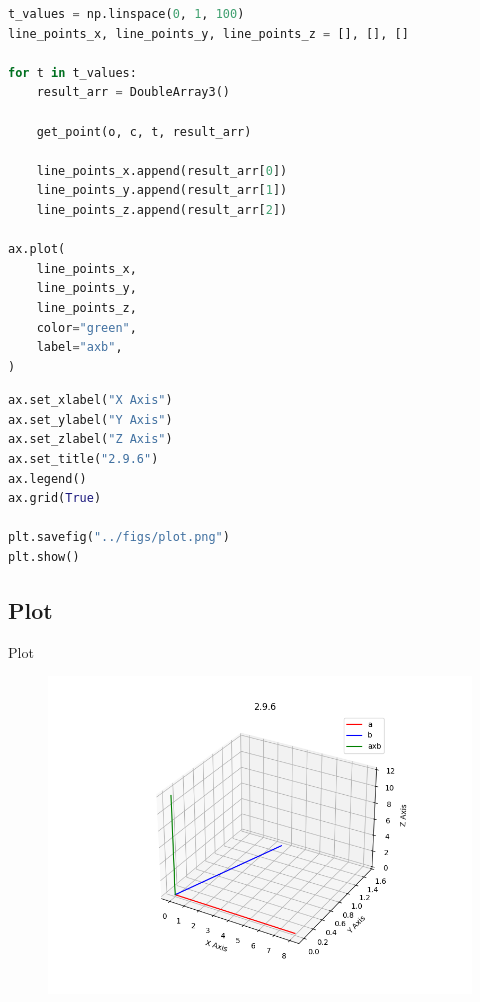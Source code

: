 \documentclass{beamer}
\theoremstyle{remark}
\numberwithin{equation}{section}
\begin{document}
\begin{frame}[fragile]
 \begin{lstlisting}[language=Python]
  t_values = np.linspace(0, 1, 100)
line_points_x, line_points_y, line_points_z = [], [], []

for t in t_values:
    result_arr = DoubleArray3()

    get_point(o, c, t, result_arr)

    line_points_x.append(result_arr[0])
    line_points_y.append(result_arr[1])
    line_points_z.append(result_arr[2])

ax.plot(
    line_points_x,
    line_points_y,
    line_points_z,
    color="green",
    label="axb",
)
 \end{lstlisting}
\end{frame}
\begin{frame}[fragile]
 \begin{lstlisting}[language=Python]
ax.set_xlabel("X Axis")
ax.set_ylabel("Y Axis")
ax.set_zlabel("Z Axis")
ax.set_title("2.9.6")
ax.legend()
ax.grid(True)

plt.savefig("../figs/plot.png")
plt.show()
 \end{lstlisting}
\end{frame}
\subsection{Plot}
\begin{frame}{Plot}
 \begin{figure}[H]
    \centering
    \includegraphics[width=0.8\columnwidth]{../figs/plot.png}
    \caption*{}
    \label{fig:plot}
\end{figure}
\end{frame}
\end{document}
